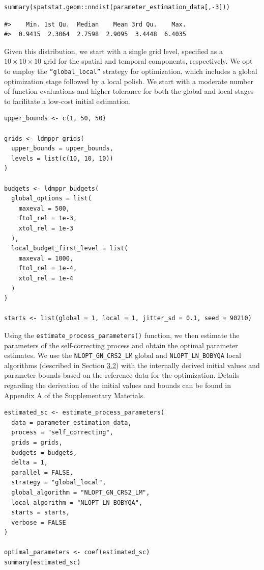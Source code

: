 \begin{verbatim}
summary(spatstat.geom::nndist(parameter_estimation_data[,-3]))
\end{verbatim}

\begin{verbatim}
#>    Min. 1st Qu.  Median    Mean 3rd Qu.    Max. 
#>  0.9415  2.3064  2.7598  2.9095  3.4448  6.4035
\end{verbatim}

{Given this distribution, we start with a single grid level, specified as a \(10 \times 10 \times 10\) grid for the spatial and temporal components, respectively. We opt to employ the \texttt{“global\_local”} strategy for optimization, which includes a global optimization stage followed by a local polish. We start with a moderate number of function evaluations and higher tolerance for both the global and local stages to facilitate a low-cost initial estimation.}

\begin{verbatim}
upper_bounds <- c(1, 50, 50)

grids <- ldmppr_grids(
  upper_bounds = upper_bounds,
  levels = list(c(10, 10, 10))
)

budgets <- ldmppr_budgets(
  global_options = list(
    maxeval = 500,
    ftol_rel = 1e-3,
    xtol_rel = 1e-3
  ),
  local_budget_first_level = list(
    maxeval = 1000,
    ftol_rel = 1e-4,
    xtol_rel = 1e-4
  )
)

starts <- list(global = 1, local = 1, jitter_sd = 0.1, seed = 90210)
\end{verbatim}

{Using the \texttt{estimate\_process\_parameters()} function, we then estimate the parameters of the self-correcting process and obtain the optimal parameter estimates. We use the \texttt{NLOPT\_GN\_CRS2\_LM} global and \texttt{NLOPT\_LN\_BOBYQA} local algorithms (described in Section \hyperref[scestimation]{3.2}) with the internally derived initial values and parameter bounds based on the reference data for the optimization. Details regarding the derivation of the initial values and bounds can be found in Appendix A of the Supplementary Materials.}

\begin{verbatim}
estimated_sc <- estimate_process_parameters(
  data = parameter_estimation_data,
  process = "self_correcting",
  grids = grids,
  budgets = budgets,
  delta = 1,
  parallel = FALSE,
  strategy = "global_local",
  global_algorithm = "NLOPT_GN_CRS2_LM",
  local_algorithm = "NLOPT_LN_BOBYQA",
  starts = starts,
  verbose = FALSE
)

optimal_parameters <- coef(estimated_sc)
summary(estimated_sc)
\end{verbatim}

